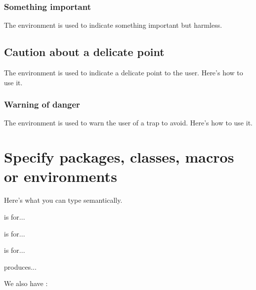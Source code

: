 
\subsubsection{Something important}

The  environment is used to indicate something important but harmless.




\subsection{Caution about a delicate point}

The  environment is used to indicate a delicate point to the user. Here's how to use it.





\subsubsection{Warning of danger}

The  environment is used to warn the user of a trap to avoid. Here's how to use it.




\section{Specify packages, classes, macros or environments}

Here's what you can type semantically.


\begin{tdoclatex}[sbs]
 is for...

 is for...

 is for...

 produces...

We also have :

\end{tdoclatex}


